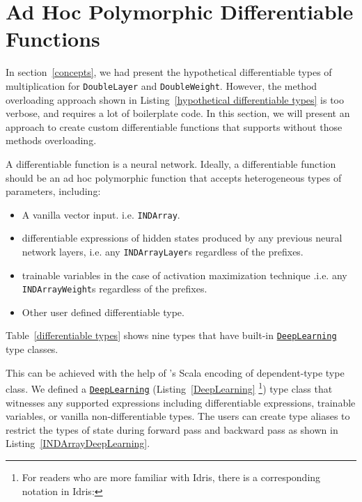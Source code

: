 \section{Ad Hoc Polymorphic Differentiable Functions}
\label{Ad Hoc Polymorphism} 

In section~\ref{concepts}, we had present the hypothetical differentiable types of multiplication for \lstinline{DoubleLayer} and \lstinline{DoubleWeight}. However, the method overloading approach shown in Listing~\ref{hypothetical differentiable types} is too verbose, and requires a lot of boilerplate code. In this section, we will present an approach to create custom \glspl{differentiable function} that supports without those methods overloading.

A \gls{differentiable function} is a neural network. 
Ideally, a differentiable function should be an ad hoc polymorphic function that accepts heterogeneous types of parameters, including:

\begin{itemize}
  
  \item A vanilla vector input. i.e. \lstinline{INDArray}.

  \item \Glspl{differentiable expression} of hidden states produced by any previous neural network layers, i.e. any \lstinline{INDArrayLayer}s regardless of the prefixes.
  
  \item \Glspl{trainable variable} in the case of activation maximization technique \cite{erhan2009visualizing}.i.e. any \lstinline{INDArrayWeight}s regardless of the prefixes.
  
  \item Other user defined differentiable type.

\end{itemize}

Table~\ref{differentiable types} shows nine types that have built-in \href{https://javadoc.io/page/com.thoughtworks.deeplearning/deeplearning_2.11/latest/com/thoughtworks/deeplearning/DeepLearning.html}{\lstinline{DeepLearning}} type classes.

This can be achieved with the help of \cite{gurnelltype}'s Scala encoding of dependent-type type class. We defined a \href{https://javadoc.io/page/com.thoughtworks.deeplearning/deeplearning_2.11/latest/com/thoughtworks/deeplearning/DeepLearning.html}{\lstinline{DeepLearning}} (Listing~\ref{DeepLearning} \footnote{
For readers who are more familiar with Idris, there is a corresponding notation in Idris:
\par\usebox{\IdrisDeepLearning}
}) type class that witnesses any supported expressions including \glspl{differentiable expression}, \glspl{trainable variable}, or vanilla non-differentiable types. The users can create type aliases to restrict the types of state during forward pass and backward pass as shown in Listing~\ref{INDArrayDeepLearning}.

